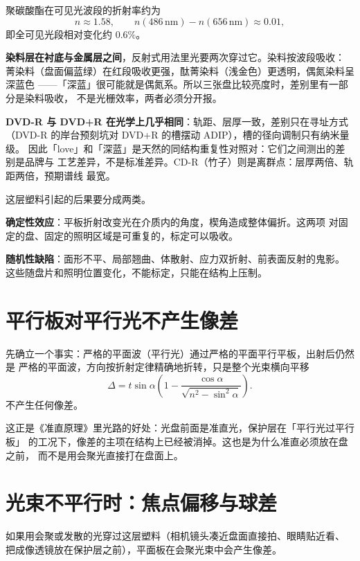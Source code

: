 \documentclass[a4paper,11pt]{ctexart}
\begin{document}
聚碳酸酯在可见光波段的折射率约为
\[
n \approx 1.58,\qquad
n(486\,\mathrm{nm})-n(656\,\mathrm{nm})\approx 0.01,
\]
即全可见光段相对变化约 $0.6\%$。

\textbf{染料层在衬底与金属层之间}，反射式用法里光要两次穿过它。染料按波段吸收：
菁染料（盘面偏蓝绿）在红段吸收更强，酞菁染料（浅金色）更透明，偶氮染料呈深蓝色
——「深蓝」很可能就是偶氮系。所以三张盘比较亮度时，差别里有一部分是染料吸收，
不是光栅效率，两者必须分开报。

\textbf{DVD-R 与 DVD+R 在光学上几乎相同}：轨距、层厚一致，差别只在寻址方式
（DVD-R 的岸台预刻坑对 DVD+R 的槽摆动 ADIP），槽的径向调制只有纳米量级。
因此「love」和「深蓝」是天然的同结构重复性对照对：它们之间测出的差别是品牌与
工艺差异，不是标准差异。CD-R（竹子）则是离群点：层厚两倍、轨距两倍，预期谱线
最宽。

这层塑料引起的后果要分成两类。

\textbf{确定性效应}：平板折射改变光在介质内的角度，楔角造成整体偏折。这两项
对固定的盘、固定的照明区域是可重复的，标定可以吸收。

\textbf{随机性缺陷}：面形不平、局部翘曲、体散射、应力双折射、前表面反射的鬼影。
这些随盘片和照明位置变化，不能标定，只能在结构上压制。

\section{平行板对平行光不产生像差}
\label{sec:planewave}

先确立一个事实：严格的平面波（平行光）通过严格的平面平行平板，出射后仍然是
严格的平面波，方向按折射定律精确地折转，只是整个光束横向平移
\begin{equation}
\label{eq:shift}
\Delta = t\sin\alpha\left(1-\frac{\cos\alpha}{\sqrt{n^2-\sin^2\alpha}}\right).
\end{equation}
不产生任何像差。

这正是《准直原理》里光路的好处：光盘前面是准直光，保护层在「平行光过平行板」
的工况下，像差的主项在结构上已经被消掉。这也是为什么准直必须放在盘之前，
而不是用会聚光直接打在盘面上。

\section{光束不平行时：焦点偏移与球差}
\label{sec:focus}

如果用会聚或发散的光穿过这层塑料（相机镜头凑近盘面直接拍、眼睛贴近看、
把成像透镜放在保护层之前），平面板在会聚光束中会产生像差。
\end{document}
